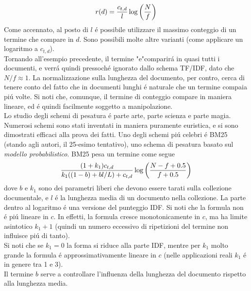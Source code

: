 \begin{equation*}
    r(d) = \frac{c_{t, d}}{l}\log\left(\frac{N}{f}\right)
\end{equation*}
Come accennato, al posto di $l$ é possibile utilizzare il massimo conteggio di un termine che compare in $d$. Sono possibili molte altre varianti (come applicare un logaritmo a $c_{t, d}$).\\
Tornando all'esempio precedente, il termine "e"comparirá in quasi tutti i documenti, e verrá quindi pressoché ignorato dallo schema TF/IDF, dato che $N / f \approx 1$. La normalizzazione sulla lunghezza del documento, per contro, cerca di tenere conto del fatto che in documenti lunghi é naturale che un termine compaia piú volte. Si noti che, comunque, il termine di conteggio compare in maniera lineare, ed é quindi facilmente soggetto a manipolazione.\\
Lo studio degli schemi di pesatura é parte arte, parte scienza e parte magia. Numerosi schemi sono stati inventati in maniera puramente euristica, e si sono dimostrati efficaci alla prova dei fatti. Uno degli schemi piú celebri é BM25 (stando agli autori, il 25-esimo tentativo), uno schema di pesatura basato sul \textit{modello probabilistico}. BM25 pesa un termine come segue
\begin{equation*}
    \frac{(1 + k_1)c_{t, d}}{k_1((1 - b) + bl / L) + c_{t, d}}\log\left(\frac{N - f + 0.5}{f + 0.5}\right)
\end{equation*}
dove $b$ e $k_1$ sono dei parametri liberi che devono essere tarati sulla collezione documentale, e $l$ é la lunghezza media di un documento nella collezione. La parte dentro al logaritmo é una versione del punteggio IDF. Si noti che la formula non é piú lineare in $c$. In effetti, la formula cresce monotonicamente in $c$, ma ha limite asintotico $k_1 + 1$ (quindi un numero eccessivo di ripetizioni del termine non influisce piú di tanto).\\
Si noti che se $k_1 = 0$ la forma si riduce alla parte IDF, mentre per $k_1$ molto grande la formula é approssimativamente lineare in $c$ (nelle applicazioni reali $k_1$ é in genere tra 1 e 3).\\
Il termine $b$ serve a controllare l'influenza della lunghezza del documento rispetto alla lunghezza media.